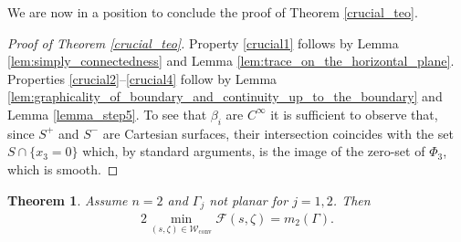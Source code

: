 \documentclass[11pt]{article}
\numberwithin{equation}{section}
\newcommand\admclassconv{{\mathcal W_\mathrm{conv}}}
\newtheorem{theorem}{Theorem}[section]
\theoremstyle{definition}
\begin{document}
We are now in a position to conclude the proof of Theorem \ref{crucial_teo}.

\begin{proof}[Proof of Theorem \ref{crucial_teo}]
Property \ref{crucial1} follows by Lemma \ref{lem:simply_connectedness} and Lemma \ref{lem:trace_on_the_horizontal_plane}.
Properties \ref{crucial2}--\ref{crucial4} follow by Lemma
\ref{lem:graphicality_of_boundary_and_continuity_up_to_the_boundary} and Lemma \ref{lemma_step5}. To see that $\beta_i$ are
$C^\infty$ it is sufficient to observe that, since $S^+$ and $S^-$ are Cartesian surfaces, their intersection
coincides
with the set $S\cap\{x_3=0\}$ which, by standard arguments,
is the image of the zero-set of $\Phi_3$, which is smooth.
\end{proof}
\begin{theorem}\label{teorema-finale}
{ Assume $n=2$ and $\Gamma_j$ not planar for $j=1,2$.}
Then
\begin{align}
2\min_{(s,\zeta)\in \admclassconv}\mathcal F(s,\zeta)= m_2(\Gamma).
\end{align}
\end{theorem}
\end{document}
